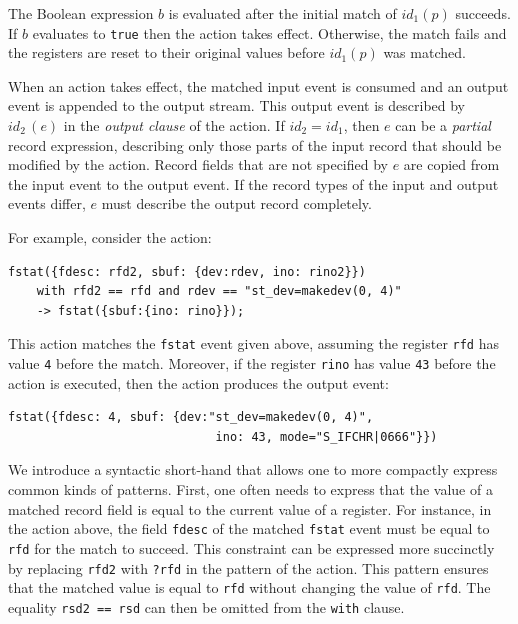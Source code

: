 The Boolean expression $b$ is evaluated after the initial match of $\mathit{id}_1(p)$ succeeds. If $b$ evaluates to \lstinline+true+ then the action takes effect. Otherwise, the match fails and the registers are reset to their original values before $\mathit{id}_1(p)$ was matched.

When an action takes effect, the matched input event is consumed and an output event is appended to the output stream. This output event is described by $\mathit{id}_2\,(e)$ in the \emph{output clause} of the action. If $\mathit{id}_2=\mathit{id}_1$, then $e$ can be a \emph{partial} record expression, describing only those parts of the input record that should be modified by the action. Record fields that are not specified by $e$ are copied from the input event to the output event. If the record types of the input and output events differ, $e$ must describe the output record completely.

For example, consider the action:
\begin{lstlisting}[numbers=none,xleftmargin=0em,gobble=2]
  fstat({fdesc: rfd2, sbuf: {dev:rdev, ino: rino2}})
    with rfd2 == rfd and rdev == "st_dev=makedev(0, 4)"
    -> fstat({sbuf:{ino: rino}});
\end{lstlisting}
This action matches the \lstinline+fstat+ event given above, assuming the register \lstinline+rfd+ has value \lstinline+4+ before the match. Moreover, if the register \lstinline+rino+ has value \lstinline+43+ before the action is executed, then the action produces the output event:
\begin{lstlisting}[numbers=none,xleftmargin=0em,gobble=2]
  fstat({fdesc: 4, sbuf: {dev:"st_dev=makedev(0, 4)",
                             ino: 43, mode="S_IFCHR|0666"}})
\end{lstlisting}

We introduce a syntactic short-hand that allows one to more compactly express common kinds of patterns. First, one often needs to express that the value of a matched record field is equal to the current value of a register. For instance, in the action above, the field \lstinline+fdesc+ of the matched \lstinline+fstat+ event must be equal to \lstinline+rfd+ for the match to succeed. This constraint can be expressed more succinctly by replacing \lstinline+rfd2+ with \lstinline+?rfd+ in the pattern of the action. This pattern ensures that the matched value is equal to \lstinline+rfd+ without changing the value of \lstinline+rfd+. The equality \lstinline+rsd2 == rsd+ can then be omitted from the \lstinline+with+ clause.

